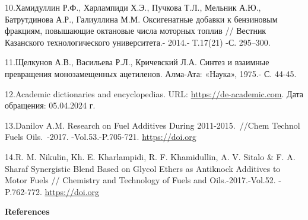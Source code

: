 \begin{references}
10.Хамидуллин Р.Ф., Харлампиди Х.Э., Пучкова Т.Л., Мельник А.Ю.,
Батрутдинова А.Р., Галиуллина М.М. Оксигенатные добавки к бензиновым
фракциям, повышающие октановые числа моторных топлив // Вестник
Казанского технологического университета.- 2014.- Т.17(21) -С. 295--300.

11.Щелкунов А.В., Васильева Р.Л., Кричевский Л.А. Синтез и взаимные
превращения монозамещенных ацетиленов. Алма-Ата: «Наука», 1975.- С.
44-45.

12.Academic dictionaries and encyclopedias. URL:
\href{https://de-academic.com/dic.nsf/dewiki/411193}{https://de-academic.com}. Дата обращения:
05.04.2024 г.

13.Danilov A.M. Research on Fuel Additives During 2011-2015.~//Chem
Technol Fuels Oils.~-2017. -Vol.53.-P.705-721.
\href{https://doi.org/10.1007/s10553-017-0853-z}{https://doi.org}

14.R. M. Nikulin, Kh. E. Kharlampidi, R. F. Khamidullin, A. V. Sitalo \&
F. A. Sharaf Synergistic Blend Based on Glycol Ethers as Antiknock
Additives to Motor Fuels // Chemistry and Technology of Fuels and
Oils.-2017.-Vol.52. - P.762-772.
\href{https://doi.org/10.1007/s10553-017-0771-0}{https://doi.org}
\end{references}

\begin{center}
{\bfseries References}
\end{center}


